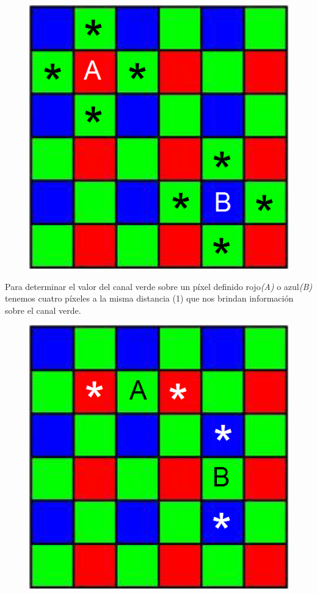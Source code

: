 \documentclass[a4paper]{article}
\begin{document}
\begin{figure}[h!]
	\caption{}
	\begin{center}
	\includegraphics[scale=0.36]{imagenes/vecino1}
	\label{Vecino1}
  \end{center}
\end{figure}

Para determinar el valor del canal verde sobre un p\'ixel definido rojo\emph{(A)} o azul\emph{(B)} tenemos cuatro p\'ixeles a la misma distancia (1) que nos brindan informaci\'on sobre el canal verde. 
\begin{figure}[h!]
	\caption{}
	\begin{center}
	\includegraphics[scale=0.36]{imagenes/vecino2}
	\label{Vecino2}
  \end{center}
\end{figure}
\end{document}
